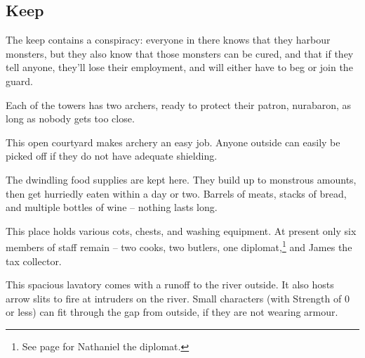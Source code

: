 \begin{multicols}{2}
\subsection{ Keep}

The keep contains a conspiracy: everyone in there knows that they harbour monsters, but they also know that those monsters can be cured, and that if they tell anyone, they'll lose their employment, and will either have to beg or join the \gls{guard}.


Each of the towers has two archers, ready to protect their patron, \gls{nurabaron}, as long as nobody gets too close.





This open courtyard makes archery an easy job.  Anyone outside can easily be picked off if they do not have adequate shielding.


The dwindling food supplies are kept here.  They build up to monstrous amounts, then get hurriedly eaten within a day or two.  Barrels of meats, stacks of bread, and multiple bottles of wine -- nothing lasts long.


This place holds various cots, chests, and washing equipment.  At present only six members of staff remain -- two cooks, two butlers, one diplomat,\footnote{See page \pageref{nathaniel} for Nathaniel the diplomat.} and James the tax collector.


This spacious lavatory comes with a runoff to the river outside.
It also hosts arrow slits to fire at intruders on the river.
Small characters (with Strength of 0 or less) can fit through the gap from outside, if they are not wearing armour.


\end{multicols}
